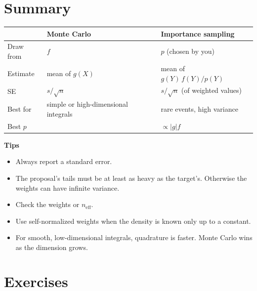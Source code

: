 \documentclass[
]{article}
\newcounter{none} %
\providecommand{\tightlist}{%
  \setlength{\itemsep}{0pt}\setlength{\parskip}{0pt}}
\begin{document}
\section{Summary}\label{summary}

{\def\LTcaptype{none} %
\begin{longtable}[]{@{}
  >{\raggedright\arraybackslash}p{}
  >{\raggedright\arraybackslash}p{}
  >{\raggedright\arraybackslash}p{}@{}}
\toprule\noalign{}
\begin{minipage}[b]{\linewidth}\raggedright
\end{minipage} & \begin{minipage}[b]{\linewidth}\raggedright
Monte Carlo
\end{minipage} & \begin{minipage}[b]{\linewidth}\raggedright
Importance sampling
\end{minipage} \\
\midrule\noalign{}
\endhead
\bottomrule\noalign{}
\endlastfoot
Draw from & \(f\) & \(p\) (chosen by you) \\
Estimate & mean of \(g(X)\) & mean of \(g(Y)\,f(Y)/p(Y)\) \\
SE & \(s/\sqrt n\) & \(s/\sqrt n\) (of weighted values) \\
Best for & simple or high-dimensional integrals & rare events, high
variance \\
Best \(p\) & & \(\propto \lvert g\rvert f\) \\
\end{longtable}
}

\textbf{Tips}

\begin{itemize}
\tightlist
\item
  Always report a standard error.
\item
  The proposal's tails must be at least as heavy as the target's.
  Otherwise the weights can have infinite variance.
\item
  Check the weights or \(n_{\text{eff}}\).
\item
  Use self-normalized weights when the density is known only up to a
  constant.
\item
  For smooth, low-dimensional integrals, quadrature is faster. Monte
  Carlo wins as the dimension grows.
\end{itemize}

\section{Exercises}\label{exercises}
\end{document}
